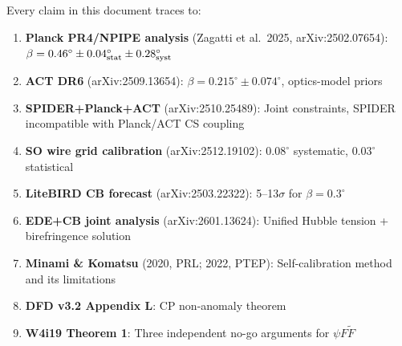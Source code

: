 \documentclass[11pt]{article}
\begin{document}
Every claim in this document traces to:
\begin{enumerate}
\item \textbf{Planck PR4/NPIPE analysis} (Zagatti et al.\ 2025,
  arXiv:2502.07654): $\beta = 0.46^\circ \pm 0.04^\circ_{\rm stat}
  \pm 0.28^\circ_{\rm syst}$
\item \textbf{ACT DR6} (arXiv:2509.13654): $\beta = 0.215^\circ
  \pm 0.074^\circ$, optics-model priors
\item \textbf{SPIDER+Planck+ACT} (arXiv:2510.25489): Joint constraints,
  SPIDER incompatible with Planck/ACT CS coupling
\item \textbf{SO wire grid calibration} (arXiv:2512.19102):
  $0.08^\circ$ systematic, $0.03^\circ$ statistical
\item \textbf{LiteBIRD CB forecast} (arXiv:2503.22322):
  5--13$\sigma$ for $\beta = 0.3^\circ$
\item \textbf{EDE+CB joint analysis} (arXiv:2601.13624):
  Unified Hubble tension + birefringence solution
\item \textbf{Minami \& Komatsu} (2020, PRL; 2022, PTEP):
  Self-calibration method and its limitations
\item \textbf{DFD v3.2 Appendix L}: CP non-anomaly theorem
\item \textbf{W4i19 Theorem 1}: Three independent no-go arguments
  for $\psi F\tilde{F}$
\end{enumerate}
\end{document}
